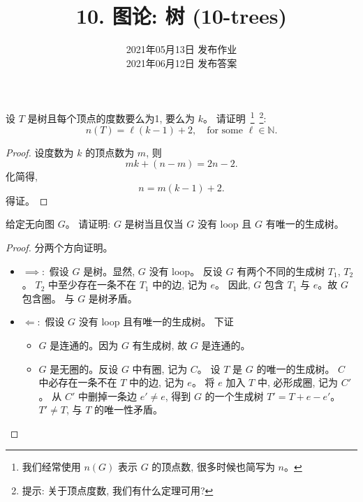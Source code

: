 \documentclass[a4paper, justified]{tufte-handout}
\title{10. 图论: 树 (10-trees)}
\date{2021年05月13日 发布作业 \\ 2021年06月12日 发布答案}
\begin{document}
\maketitle
\noplagiarism %
\begin{abstract}
\end{abstract}
\beginrequired

\begin{problem}
  设 $T$ 是树且每个顶点的度数要么为1, 要么为 $k$。
  请证明~\footnote{我们经常使用 $n(G)$ 表示 $G$ 的顶点数,
    很多时候也简写为 $n$。}~\footnote{提示:
  关于顶点度数, 我们有什么定理可用?}:
  \[
    n(T) = \ell (k-1) + 2, \quad \text{for some } \ell \in \mathbb{N}.
  \]
\end{problem}

\begin{proof}
  设度数为 $k$ 的顶点数为 $m$, 则
  \[
    mk + (n-m) = 2n - 2.
  \]
  化简得,
  \[
    n = m(k - 1) + 2.
  \]
  得证。
\end{proof}

\begin{problem}
  给定无向图 $G$。
  请证明: $G$ 是树当且仅当 $G$ 没有 loop 且 $G$ 有唯一的生成树。
\end{problem}

\begin{proof}
  分两个方向证明。
  \begin{itemize}
    \item $\implies:$ 假设 $G$ 是树。显然, $G$ 没有 loop。
      反设 $G$ 有两个不同的生成树 $T_{1}$, $T_{2}$。
      $T_{2}$ 中至少存在一条不在 $T_{1}$ 中的边, 记为 $e$。
      因此, $G$ 包含 $T_{1}$ 与 $e$。故 $G$ 包含圈。
      与 $G$ 是树矛盾。
    \item $\Longleftarrow:$ 假设 $G$ 没有 loop 且有唯一的生成树。
      下证
      \begin{itemize}
        \item $G$ 是连通的。因为 $G$ 有生成树, 故 $G$ 是连通的。
        \item $G$ 是无圈的。反设 $G$ 中有圈, 记为 $C$。
          设 $T$ 是 $G$ 的唯一的生成树。
          $C$ 中必存在一条不在 $T$ 中的边, 记为 $e$。
          将 $e$ 加入 $T$ 中, 必形成圈, 记为 $C'$。
          从 $C'$ 中删掉一条边 $e' \neq e$,
          得到 $G$ 的一个生成树 $T' = T + e - e'$。
          $T' \neq T$, 与 $T$ 的唯一性矛盾。
      \end{itemize}
  \end{itemize}
\end{proof}
\end{document}
